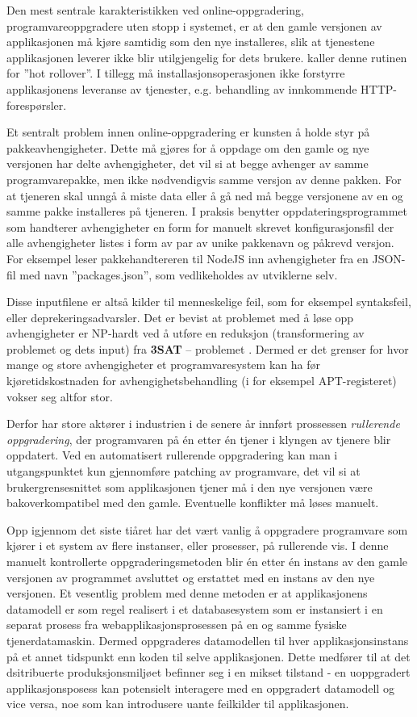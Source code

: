 Den mest sentrale karakteristikken ved online-oppgradering, programvareoppgradere uten stopp i systemet, er at den gamle versjonen av applikasjonen må kjøre samtidig som den nye installeres, slik at tjenestene applikasjonen leverer ikke blir utilgjengelig for dets brukere. \cite{choi2009} kaller denne rutinen for ''hot rollover''. I tillegg må installasjonsoperasjonen ikke forstyrre applikasjonens leveranse av tjenester, e.g. behandling av innkommende HTTP-forespørsler.

Et sentralt problem innen online-oppgradering er kunsten å holde styr på pakkeavhengigheter. Dette må gjøres for å oppdage om den gamle og nye versjonen har delte avhengigheter, det vil si at begge avhenger av samme programvarepakke, men ikke nødvendigvis samme versjon av denne pakken. For at tjeneren skal unngå å miste data eller å gå ned må begge versjonene av en og samme pakke installeres på tjeneren. I praksis benytter oppdateringsprogrammet som handterer avhengigheter en form for manuelt skrevet konfigurasjonsfil der alle avhengigheter listes i form av par av unike pakkenavn og påkrevd versjon. For eksempel leser pakkehandtereren til NodeJS inn avhengigheter fra en JSON-fil med navn ''packages.json'', som vedlikeholdes av utviklerne selv.

Disse inputfilene er altså kilder til menneskelige feil, som for eksempel syntaksfeil, eller deprekeringsadvarsler. Det er bevist at problemet med å løse opp avhengigheter er NP-hardt ved å utføre en reduksjon (transformering av problemet og dets input) fra \textbf{3SAT} -- problemet \citep{dumitracs2009upgrades}. Dermed er det grenser for hvor mange og store avhengigheter et programvaresystem kan ha før kjøretidskostnaden for avhengighetsbehandling (i for eksempel APT-registeret) vokser seg altfor stor.

Derfor har store aktører i industrien i de senere år innført prossessen \emph{rullerende oppgradering}, der programvaren på én etter én tjener i klyngen av tjenere blir oppdatert. Ved en automatisert rullerende oppgradering kan man i utgangspunktet kun gjennomføre patching av programvare, det vil si at brukergrensesnittet som applikasjonen tjener må i den nye versjonen være bakoverkompatibel med den gamle. Eventuelle konflikter må løses manuelt.

Opp igjennom det siste tiåret har det vært vanlig å oppgradere programvare som kjører i et system av flere instanser, eller prosesser, på rullerende vis. I denne manuelt kontrollerte oppgraderingsmetoden blir én etter én instans av den gamle versjonen av programmet avsluttet og erstattet med en instans av den nye versjonen. Et vesentlig problem med denne metoden er at applikasjonens datamodell er som regel realisert i et databasesystem som er instansiert i en separat prosess fra webapplikasjonsprosessen på en og samme fysiske tjenerdatamaskin. Dermed oppgraderes datamodellen til hver applikasjonsinstans på et annet tidspunkt enn koden til selve applikasjonen. Dette medfører til at det dsitribuerte produksjonsmiljøet befinner seg i en mikset tilstand - en uoppgradert applikasjonsposess kan potensielt interagere med en oppgradert datamodell og vice versa, noe som kan introdusere uante feilkilder til applikasjonen.
